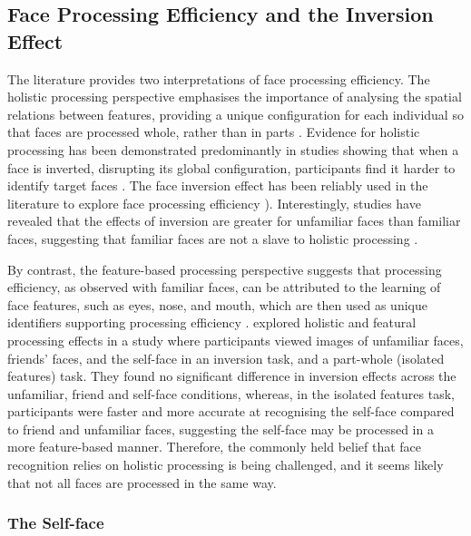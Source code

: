 \documentclass[
  10pt,
  letterpaper,
]{article}
\begin{document}
\subsection{Face Processing Efficiency and the Inversion
Effect}\label{face-processing-efficiency-and-the-inversion-effect}

The literature provides two interpretations of face processing
efficiency. The holistic processing perspective emphasises the
importance of analysing the spatial relations between features,
providing a unique configuration for each individual so that faces are
processed whole, rather than in parts
\citep{sandford2014a, maurer_many_2002}. Evidence for holistic
processing has been demonstrated predominantly in studies showing that
when a face is inverted, disrupting its global configuration,
participants find it harder to identify target faces
\citep{taubert2011a, tong1999a}. The face inversion effect has been
reliably used in the literature to explore face processing efficiency
\href{Rossion\%202008\%20Acta\%20Psych;\%20Valentine\%201988;\%20Taubert,\%20Van\%20Belle\%20et\%20al\%202015\%20Journal\%20of\%20Neurophysiology}{}).
Interestingly, studies have revealed that the effects of inversion are
greater for unfamiliar faces than familiar faces, suggesting that
familiar faces are not a slave to holistic processing
\citep{ramon2016a, oleggio2017a, waidmann_local_2022}.

By contrast, the feature-based processing perspective suggests that
processing efficiency, as observed with familiar faces, can be
attributed to the learning of face features, such as eyes, nose, and
mouth, which are then used as unique identifiers supporting processing
efficiency \citep{abudarham2016a}. \citet{lee2022a} explored holistic
and featural processing effects in a study where participants viewed
images of unfamiliar faces, friends' faces, and the self-face in an
inversion task, and a part-whole (isolated features) task. They found no
significant difference in inversion effects across the unfamiliar,
friend and self-face conditions, whereas, in the isolated features task,
participants were faster and more accurate at recognising the self-face
compared to friend and unfamiliar faces, suggesting the self-face may be
processed in a more feature-based manner. Therefore, the commonly held
belief that face recognition relies on holistic processing is being
challenged, and it seems likely that not all faces are processed in the
same way.

\subsubsection{The Self-face}\label{the-self-face}
\end{document}
